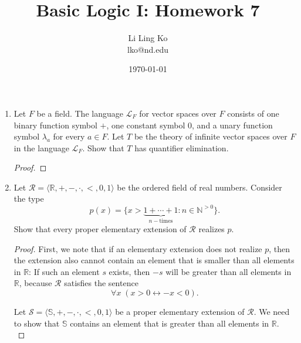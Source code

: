\documentclass{article}
\begin{document}
\title{Basic Logic I: Homework 7}
\author{Li Ling Ko\\ lko@nd.edu}
\date{\today}
\maketitle

\begin{enumerate}[label={\bf Q\arabic*:}]
  \item Let $F$ be a field. The language $\mathcal{L}_F$ for vector spaces
    over $F$ consists of one binary function symbol $+$, one constant
    symbol $0$, and a unary function symbol $\lambda_a$ for every $a\in F$.
    Let $T$ be the theory of infinite vector spaces over $F$ in the
    language $\mathcal{L}_F$. Show that $T$ has quantifier elimination.

    \begin{proof}
    \end{proof}

  \item Let $\mathcal{R}=\langle\mathbb{R},+,-,\cdot,<,0,1\rangle$ be the
    ordered field of real numbers. Consider the type
    \begin{equation*}
      p(x) =
      \{x>\underbrace{1+\cdots+1}_{n-\text{times}}:n\in\mathbb{N}^{>0}\}.
    \end{equation*}
    Show that every proper elementary extension of $\mathcal{R}$ realizes
    $p$.

    \begin{proof}
      First, we note that if an elementary extension does not realize $p$,
      then the extension also cannot contain an element that is smaller
      than all elements in $\mathbb{R}$: If such an element $s$ exists,
      then $-s$ will be greater than all elements in $\mathbb{R}$, because
      $\mathcal{R}$ satisfies the sentence
      \begin{equation*}
        \forall x\; (x>0\leftrightarrow -x<0).
      \end{equation*}

      Let $\mathcal{S}=\langle\mathbb{S},+,-,\cdot,<,0,1\rangle$ be a
      proper elementary extension of $\mathcal{R}$. We need to show that
      $\mathbb{S}$ contains an element that is greater than all elements in
      $\mathbb{R}$. \\



\end{proof}
\end{enumerate}
\end{document}
